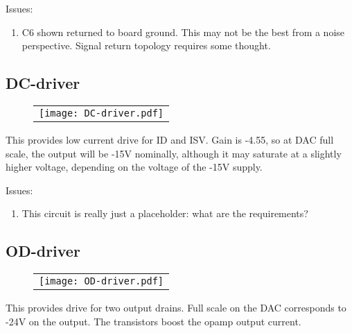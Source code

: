 \documentclass[a4paper,12pt]{article}
\begin{document}
Issues:
\begin{enumerate}
\item
C6 shown returned to board ground. This may not be the best from a noise perspective. Signal return topology requires some thought.
\end{enumerate}



\subsection{DC-driver}
   \begin{figure}
   \begin{center}
   \begin{tabular}{c}
   \texttt{[image: DC-driver.pdf]}
   \end{tabular}
   \end{center}
   \end{figure}

This provides low current drive for ID and ISV. Gain is -4.55, so at DAC full scale, the output will be -15V nominally, although it may saturate at a slightly higher voltage, depending on the voltage of the -15V supply.


Issues:
\begin{enumerate}
\item
This circuit is really just a placeholder: what are the requirements?
\end{enumerate}


\subsection{OD-driver}
   \begin{figure}
   \begin{center}
   \begin{tabular}{c}
   \texttt{[image: OD-driver.pdf]}
   \end{tabular}
   \end{center}
   \end{figure}

This provides drive for two output drains. Full scale on the DAC corresponds to -24V on the output. The transistors boost the opamp output current.

\end{document}

